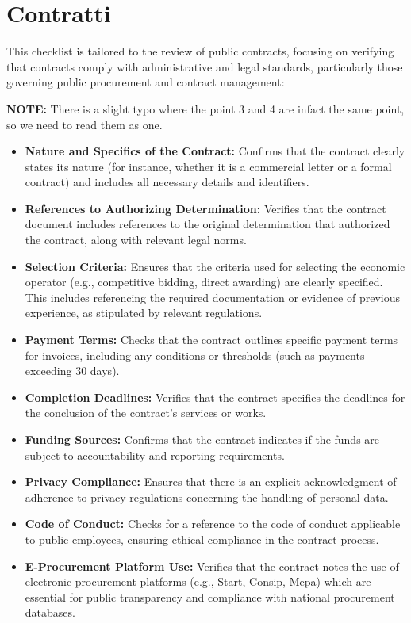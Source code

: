 \documentclass[../main.tex]{subfiles}
\begin{document}
\section*{Contratti}
This checklist is tailored to the review of public contracts, focusing on verifying that contracts comply with administrative and legal standards, particularly those governing public procurement and contract management:

\textbf{NOTE:} There is a slight typo where the point 3 and 4 are infact the same point, so we need to read them as one.

\begin{itemize}
    \item \textbf{Nature and Specifics of the Contract:}
 Confirms that the contract clearly states its nature (for instance, whether it is a commercial letter or a formal contract) and includes all necessary details and identifiers.
    \item \textbf{References to Authorizing Determination:}
 Verifies that the contract document includes references to the original determination that authorized the contract, along with relevant legal norms.
    \item \textbf{Selection Criteria:}
 Ensures that the criteria used for selecting the economic operator (e.g., competitive bidding, direct awarding) are clearly specified. This includes referencing the required documentation or evidence of previous experience, as stipulated by relevant regulations.
    \item \textbf{Payment Terms:}
 Checks that the contract outlines specific payment terms for invoices, including any conditions or thresholds (such as payments exceeding 30 days).
    \item \textbf{Completion Deadlines:}
 Verifies that the contract specifies the deadlines for the conclusion of the contract’s services or works.
    \item \textbf{Funding Sources:}
 Confirms that the contract indicates if the funds are subject to accountability and reporting requirements.
    \item \textbf{Privacy Compliance:}
 Ensures that there is an explicit acknowledgment of adherence to privacy regulations concerning the handling of personal data.
    \item \textbf{Code of Conduct:}
 Checks for a reference to the code of conduct applicable to public employees, ensuring ethical compliance in the contract process.
    \item \textbf{E-Procurement Platform Use:}
 Verifies that the contract notes the use of electronic procurement platforms (e.g., Start, Consip, Mepa) which are essential for public transparency and compliance with national procurement databases.
\end{itemize}


 
\end{document}

